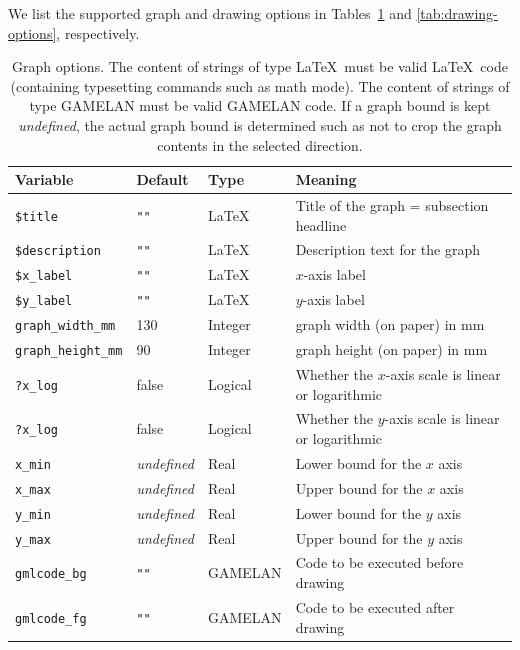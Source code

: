 \documentclass[12pt]{book}
\newcommand{\ttt}[1]{\texttt{#1}}
\begin{document}
We list the supported graph and drawing options in
Tables~\ref{tab:graph-options} and \ref{tab:drawing-options}, respectively.

\begin{table}
  \caption{Graph options.  The content of strings of type \LaTeX\ must be
    valid \LaTeX\ code (containing typesetting commands such as math mode).
    The content of strings of type GAMELAN must be valid GAMELAN code.
    If a graph bound is kept \emph{undefined}, the actual graph bound is
    determined such as not to crop the graph contents in the selected
    direction.}
  \label{tab:graph-options}

  \begin{center}
    \begin{tabular}{|l|l|l|l|}
      \hline
      Variable & Default & Type & Meaning
      \\
      \hline\hline
      \ttt{\$title}  & \ttt{""} & \LaTeX &
        Title of the graph = subsection headline
      \\
      \hline
      \ttt{\$description}  & \ttt{""} &  \LaTeX &
        Description text for the graph
      \\
      \hline
      \ttt{\$x\_label} & \ttt{""} & \LaTeX &
        $x$-axis label
      \\
      \hline
      \ttt{\$y\_label} & \ttt{""} & \LaTeX &
        $y$-axis label
      \\
      \hline
      \ttt{graph\_width\_mm} & 130 & Integer &
        graph width (on paper) in mm
      \\
      \hline
      \ttt{graph\_height\_mm} & 90 & Integer &
        graph height (on paper) in mm
      \\
      \hline
      \ttt{?x\_log} & false & Logical &
        Whether the $x$-axis scale is linear or logarithmic
      \\
      \hline
      \ttt{?x\_log} & false & Logical &
        Whether the $y$-axis scale is linear or logarithmic
      \\
      \hline
      \ttt{x\_min} & \emph{undefined} & Real &
        Lower bound for the $x$ axis
      \\
      \hline
      \ttt{x\_max} & \emph{undefined} & Real &
        Upper bound for the $x$ axis
      \\
      \hline
      \ttt{y\_min} & \emph{undefined} & Real &
        Lower bound for the $y$ axis
      \\
      \hline
      \ttt{y\_max} & \emph{undefined} & Real &
        Upper bound for the $y$ axis
      \\
      \hline
      \ttt{gmlcode\_bg} & \ttt{""} & GAMELAN &
         Code to be executed before drawing
      \\
      \hline
      \ttt{gmlcode\_fg} & \ttt{""} & GAMELAN &
         Code to be executed after drawing
      \\
      \hline
    \end{tabular}
  \end{center}
\end{table}
\end{document}
